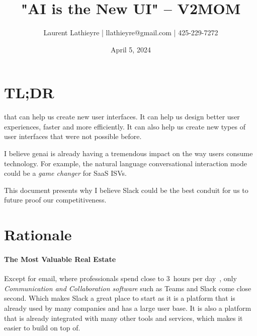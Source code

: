 \documentclass{tufte-handout}
\title{"AI is the New UI" – V2MOM}
\author{\small Laurent Lathieyre | llathieyre@gmail.com | 425-229-7272}
\date{April 5, 2024} %
\begin{document}
\maketitle %


\section{TL;DR}\label{sec:tldr}
 that can help us create new user interfaces. It can help us design better user experiences, faster and more efficiently. It can also help us create new types of user interfaces that were not possible before. 

I believe \gls{genai} is already having a tremendous impact on the way users consume technology. For example, the natural language conversational interaction mode could be a \emph{game changer} for SaaS ISVs.

This document presents why I believe Slack could be the best conduit for us to future proof our competitiveness.

\section{Rationale}\label{sec:Rationale}
\paragraph{The Most Valuable Real Estate}\label{sec:real-estate} Except for  email, where professionals spend close to 3~hours per day~\cite[+5pt]{mattplummerHowSpendWay2019}, only \emph{Communication and Collaboration software} such as Teams and Slack come close second. Which makes Slack a great place to start as it is a platform that is already used by many companies and has a large user base. 
It is also a platform that is already integrated with many other tools and services, which makes it easier to build on top of.
\end{document}
